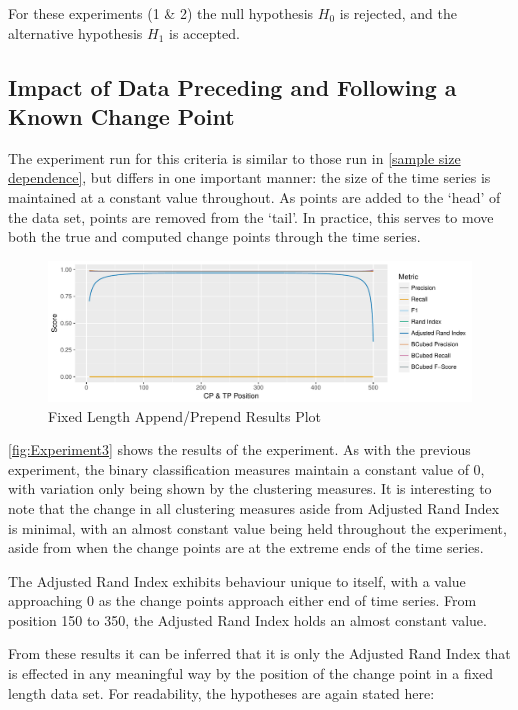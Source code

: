 \documentclass[../main.tex]{subfiles}
\begin{document}
For these experiments (1 \& 2) the null hypothesis $H_0$ is rejected, and the alternative hypothesis $H_1$ is accepted.

\subsection{Impact of Data Preceding and Following a Known Change Point}

The experiment run for this criteria is similar to those run in \autoref{sample size dependence}, but differs in one important manner: the size of the time series is maintained at a constant value throughout. As points are added to the `head' of the data set, points are removed from the `tail'. In practice, this serves to move both the true and computed change points through the time series.

\begin{figure}[h]
    \includegraphics[width=\textwidth]{figures/Experiment2}
    \caption{Fixed Length Append/Prepend Results Plot}
    \label{fig:Experiment3}
\end{figure}

\autoref{fig:Experiment3} shows the results of the experiment. As with the previous experiment, the binary classification measures maintain a constant value of $0$, with variation only being shown by the clustering measures. It is interesting to note that the change in all clustering measures aside from Adjusted Rand Index is minimal, with an almost constant value being held throughout the experiment, aside from when the change points are at the extreme ends of the time series.

The Adjusted Rand Index exhibits behaviour unique to itself, with a value approaching 0 as the change points approach either end of time series. From position 150 to 350, the Adjusted Rand Index holds an almost constant value.

From these results it can be inferred that it is only the Adjusted Rand Index that is effected in any meaningful way by the position of the change point in a fixed length data set. For readability, the hypotheses are again stated here:
\end{document}
